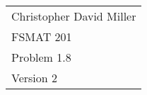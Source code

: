 \documentclass[12pt]{article}
\begin{document}
\newtheorem{prop}{Proposition}

\begin{flushright}
\begin{tabular}{l}
Christopher David Miller \\  %
FSMAT 201 \\  %
Problem 1.8 \\  %
Version 2 \\ %
\end{tabular}
\end{flushright}
\vspace{20pt}  %

\end{document}
